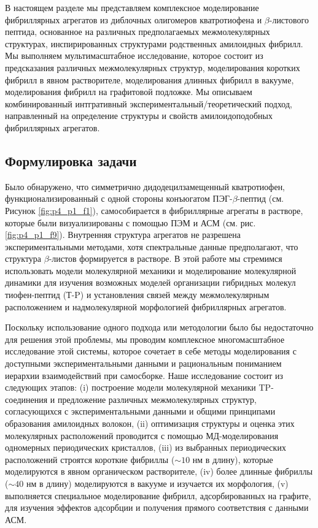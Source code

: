     В настоящем разделе мы представляем комплексное моделирование фибриллярных агрегатов из диблочных олигомеров кватротиофена и $\beta$-листового пептида, основанное на различных предполагаемых межмолекулярных структурах, инспирированных структурами родственных амилоидных фибрилл. Мы выполняем мультимасштабное исследование, которое состоит из \cite{schopf_polythiophenes_1997} предсказания различных межмолекулярных структур, \cite{garten_light-emitting_1996} моделирования коротких фибрилл в явном растворителе, \cite{choi_polymers_2008} моделирования длинных фибрилл в вакууме, \cite{cai_polymer_2009} моделирования фибрилл на графитовой подложке. Мы описываем комбинированный интгративный экспериментальный/теоретический подход, направленный на определение структуры и свойств амилоидоподобных фибриллярных агрегатов.

\subsection{Формулировка задачи}

    Было обнаружено, что симметрично дидодецилзамещенный кватротиофен, функционализированный с одной стороны конъюгатом ПЭГ-$\beta$-пептид (см. Рисунок \ref{fig:p4_p1_f1}), самособирается в фибриллярные агрегаты в растворе, которые были визуализированы с помощью ПЭМ и АСМ (см. рис. \ref{fig:p4_p1_f9}). Внутренняя структура агрегатов не разрешена экспериментальными методами, хотя спектральные данные предполагают, что структура $\beta$-листов формируется в растворе. В этой работе мы стремимся использовать модели молекулярной механики и моделирование молекулярной динамики для изучения возможных моделей организации гибридных молекул тиофен-пептид (Т-P) и установления связей между межмолекулярным расположением и надмолекулярной морфологией фибриллярных агрегатов.

    Поскольку использование одного подхода или методологии было бы недостаточно для решения этой проблемы, мы проводим комплексное многомасштабное исследование этой системы, которое сочетает в себе методы моделирования с доступными экспериментальными данными и рациональным пониманием иерархии взаимодействий при самосборке. Наше исследование состоит из следующих этапов: (i) построение модели молекулярной механики TP-соединения и предложение различных межмолекулярных структур, согласующихся с экспериментальными данными и общими принципами образования амилоидных волокон, (ii) оптимизация структуры и оценка этих молекулярных расположений проводится с помощью МД-моделирования одномерных периодических кристаллов, (iii) из выбранных периодических расположений строятся короткие фибриллы ($\sim 10$ нм в длину), которые моделируются в явном органическом растворителе, (iv) более длинные фибриллы ($\sim 40$ нм в длину) моделируются в вакууме и изучается их морфология, (v) выполняется специальное моделирование фибрилл, адсорбированных на графите, для изучения эффектов адсорбции и получения прямого соответствия с данными АСМ.
    
